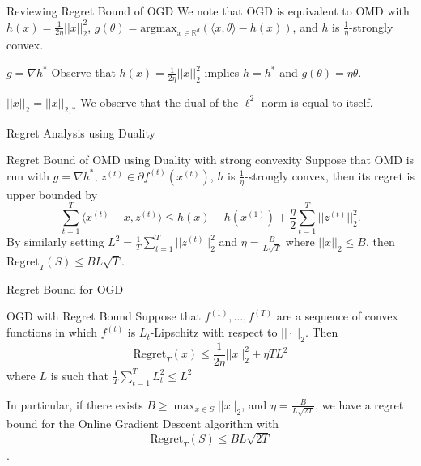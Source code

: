 \begin{frame}
    \begin{block}{Reviewing Regret Bound of OGD}
        We note that OGD is equivalent to OMD with $h(x) = \frac{1}{2\eta}||x||_2^2$,
        $g(\theta) = \text{argmax}_{x \in \mathbb{R}^d} ( \langle x, \theta \rangle - h(x) )$,
        and $h$ is $\frac{1}{\eta}$-strongly convex.
    \end{block}
    \begin{block}{$g = \nabla h^*$}
        Observe that $h(x) = \frac{1}{2\eta}||x||_2^2$ implies $h = h^*$ and $g(\theta) = \eta \theta$.
    \end{block}
    \begin{block}{$||x||_2 = ||x||_{2,*}$}
        We observe that the dual of the $\ell^2$-norm is equal to itself.
    \end{block}
\end{frame}

\begin{frame}{Regret Analysis using Duality}
\begin{block}{Regret Bound of OMD using Duality with strong convexity}
        Suppose that OMD is run with $g = \nabla h^*$, $z^{(t)} \in \partial f^{(t)}(x^{(t)})$, $h$ is $\frac{1}{\eta}$-strongly convex, then its regret is upper bounded by
        $$
        \sum_{t=1}^T\langle x^{(t)} - x, z^{(t)} \rangle \leq h(x) - h(x^{(1)}) + \frac{\eta}{2}\sum_{t=1}^T ||z^{(t)}||^2_2.
        $$
        By similarly setting $L^2 = \frac{1}{T}\sum_{t=1}^T ||z^{(t)}||_2^2$ and $\eta = \frac{B}{L\sqrt{T}}$ where $||x||_2 \leq B$, then $\text{Regret}_T(S) \leq BL\sqrt{T}$.
    \end{block}
\end{frame}

\begin{frame}{Regret Bound for OGD}
    \begin{block}{OGD with Regret Bound}
    Suppose that $f^{(1)}, \ldots, f^{(T)}$ are a sequence of convex functions in which $f^{(t)}$ is $L_t$-Lipschitz with respect to $||\cdot||_2$. Then
    \begin{equation*}
        \text{Regret}_T(x) \leq \frac{1}{2\eta}||x||_2^2 + \eta TL^2
    \end{equation*}
    where $L$ is such that $\frac{1}{T}\sum_{t=1}^TL_t^2 \leq L^2$
\end{block}
In particular, if there exists $B \geq \max_{x \in S}||x||_2$, and $\eta = \frac{B}{L\sqrt{2T}}$, we have a regret bound for the Online Gradient Descent algorithm with 
$$\text{Regret}_T(S) \leq BL \sqrt{2T}$$.
\end{frame}

